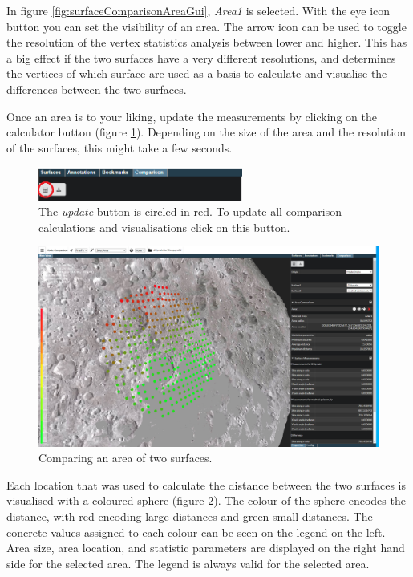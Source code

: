 In figure \ref{fig:surfaceComparisonAreaGui}, \emph{Area1} is selected. With the eye icon button you can set the visibility of an area. The arrow icon can be used to toggle the resolution of the vertex statistics analysis between lower and higher. This has a big effect if the two surfaces have a very different resolutions, and determines the vertices of which surface are used as a basis to calculate and visualise the differences between the two surfaces.

Once an area is to your liking, update the measurements by clicking on the calculator button (figure \ref{surfaceComparisonAreaUpdButton.PNG}). Depending on the size of the area and the resolution of the surfaces, this might take a few seconds.

\begin{figure}[h]
	\centering
	\includegraphics[width=0.6\textwidth]{pics/surfaceComparisonAreaUpdButton.PNG}
	\caption[The update button.]{The \emph{update} button is circled in red. To update all comparison calculations and visualisations click on this button.}
	\label{surfaceComparisonAreaUpdButton.PNG}
\end{figure}

\begin{figure}[h]
	\centering
	\includegraphics[width=1.0\textwidth]{pics/surfaceComparisonArea3DView1.PNG}
	\caption[Comparing an area of two surfaces.]{Comparing an area of two surfaces.}
	\label{surfaceComparisonArea3DView1.PNG}
\end{figure}

Each location that was used to calculate the distance between the two surfaces is visualised with a coloured sphere (figure \ref{surfaceComparisonArea3DView1.PNG}). The colour of the sphere encodes the distance, with red encoding large distances and green small distances. The concrete values assigned to each colour can be seen on the legend on the left. Area size, area location, and statistic parameters are displayed on the right hand side for the selected area. The legend is always valid for the selected area.


